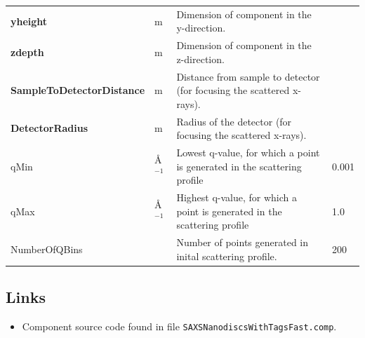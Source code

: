 \begin{longtable}{p{}p{}p{}p{}}
\textbf{yheight} & m & Dimension of component in the y-direction. &  \\
\textbf{zdepth} & m & Dimension of component in the z-direction. &  \\
\textbf{SampleToDetectorDistance} & m & Distance from sample to detector (for focusing the scattered x-rays). &  \\
\textbf{DetectorRadius} & m & Radius of the detector (for focusing the scattered x-rays). &  \\
qMin & \AA{}$^{-1}$ & Lowest q-value, for which a point is generated in the scattering profile & 0.001 \\
qMax & \AA{}$^{-1}$ & Highest q-value, for which a point is generated in the scattering profile & 1.0 \\
NumberOfQBins &  & Number of points generated in inital scattering profile. & 200 \\
\bottomrule
\end{longtable}

\subsection*{Links}
\begin{itemize}
  \item Component source code found in file \texttt{SAXSNanodiscsWithTagsFast.comp}.
\end{itemize}
